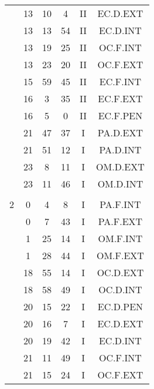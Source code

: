 \documentclass[12pt, a4paper]{article}
\begin{document}
\begin{multicols}{3}
{\begin{tabular}{c c c c c c}
	 	 	 	 & 13 & 10 & 4 & II & EC.D.EXT\\%
	 	 	 	 & 13 & 13 & 54 & II & EC.D.INT\\%
	 	 	 	 & 13 & 19 & 25 & II & OC.F.INT\\%
	 	 	 	 & 13 & 23 & 20 & II & OC.F.EXT\\%
	 	 	 	 & 15 & 59 & 45 & II & EC.F.INT\\%
	 	 	 	 & 16 & 3 & 35 & II & EC.F.EXT\\%
	 	 	 	 & 16 & 5 & 0 & II & EC.F.PEN\\%
	 	 	 	 & 21 & 47 & 37 & I & PA.D.EXT\\%
	 	 	 	 & 21 & 51 & 12 & I & PA.D.INT\\%
	 	 	 	 & 23 & 8 & 11 & I & OM.D.EXT\\%
	 	 	 	 & 23 & 11 & 46 & I & OM.D.INT\\%
	 	 	 	 & & & & & \\%
	 	 	 	2 & 0 & 4 & 8 & I & PA.F.INT\\%
	 	 	 	 & 0 & 7 & 43 & I & PA.F.EXT\\%
	 	 	 	 & 1 & 25 & 14 & I & OM.F.INT\\%
	 	 	 	 & 1 & 28 & 44 & I & OM.F.EXT\\%
	 	 	 	 & 18 & 55 & 14 & I & OC.D.EXT\\%
	 	 	 	 & 18 & 58 & 49 & I & OC.D.INT\\%
	 	 	 	 & 20 & 15 & 22 & I & EC.D.PEN\\%
	 	 	 	 & 20 & 16 & 7 & I & EC.D.EXT\\%
	 	 	 	 & 20 & 19 & 42 & I & EC.D.INT\\%
	 	 	 	 & 21 & 11 & 49 & I & OC.F.INT\\%
	 	 	 	 & 21 & 15 & 24 & I & OC.F.EXT\\%

\end{tabular}}
\end{multicols}
\end{document}

